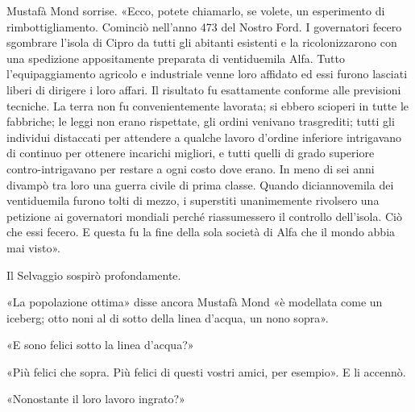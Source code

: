 \documentclass[
a5paper, %
10pt, %
twoside, 
onecolumn, %
openany, %
]{memoir}
\begin{document}
Mustafà Mond sorrise. «Ecco, potete chiamarlo, se volete, un esperimento di rimbottigliamento. Cominciò nell’anno 473 del Nostro Ford. I governatori fecero sgombrare l’isola di Cipro da tutti gli abitanti esistenti e la ricolonizzarono con una spedizione appositamente preparata di ventiduemila Alfa. Tutto l’equipaggiamento agricolo e industriale venne loro affidato ed essi furono lasciati liberi di dirigere i loro affari. Il risultato fu esattamente conforme alle previsioni tecniche. La terra non fu convenientemente lavorata; si ebbero scioperi in tutte le fabbriche; le leggi non erano rispettate, gli ordini venivano trasgrediti; tutti gli individui distaccati per attendere a qualche lavoro d’ordine inferiore intrigavano di continuo per ottenere incarichi migliori, e tutti quelli di grado superiore contro-intrigavano per restare a ogni costo dove erano. In meno di sei anni divampò tra loro una guerra civile di prima classe. Quando diciannovemila dei ventiduemila furono tolti di mezzo, i superstiti unanimemente rivolsero una petizione ai governatori mondiali perché riassumessero il controllo dell’isola. Ciò che essi fecero. E questa fu la fine della sola società di Alfa che il mondo abbia mai visto».

Il Selvaggio sospirò profondamente.

«La popolazione ottima» disse ancora Mustafà Mond «è modellata come un iceberg; otto noni al di sotto della linea d’acqua, un nono sopra».

«E sono felici sotto la linea d’acqua?»

«Più felici che sopra. Più felici di questi vostri amici, per esempio». E li accennò.

«Nonostante il loro lavoro ingrato?»
\end{document}

